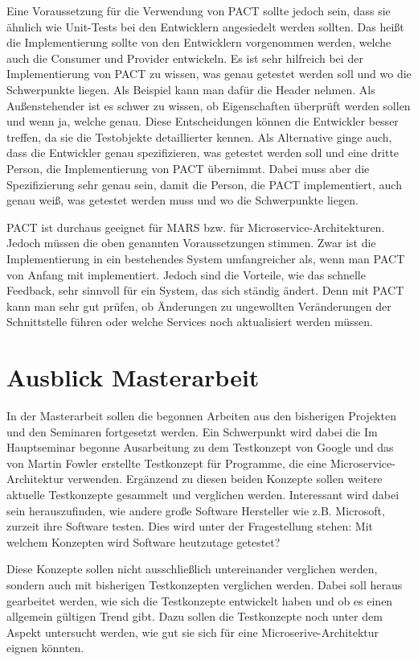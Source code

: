 \documentclass{llncs}
\begin{document}
Eine Voraussetzung für die Verwendung von PACT sollte jedoch sein, dass sie ähnlich wie Unit-Tests bei den Entwicklern angesiedelt werden sollten. Das heißt die Implementierung sollte von den Entwicklern vorgenommen werden, welche auch die Consumer und Provider entwickeln. Es ist sehr hilfreich bei der Implementierung von PACT zu wissen, was genau getestet werden soll und wo die Schwerpunkte liegen. Als Beispiel kann man dafür die Header nehmen. Als Außenstehender ist es schwer zu wissen, ob Eigenschaften überprüft werden sollen und wenn ja, welche genau. Diese Entscheidungen können die Entwickler besser treffen, da sie die Testobjekte detaillierter kennen. Als Alternative ginge auch, dass die Entwickler genau spezifizieren, was getestet werden soll und eine dritte Person, die Implementierung von PACT übernimmt. Dabei muss aber die Spezifizierung sehr genau sein, damit die Person, die PACT implementiert, auch genau weiß, was getestet werden muss und wo die Schwerpunkte liegen. 

PACT ist durchaus geeignet für MARS bzw. für Microservice-Architekturen. Jedoch müssen die oben genannten Voraussetzungen stimmen. Zwar ist die Implementierung in ein bestehendes System umfangreicher als, wenn man PACT von Anfang mit implementiert. Jedoch sind die Vorteile, wie das schnelle Feedback, sehr sinnvoll für ein System, das sich ständig ändert. Denn mit PACT kann man sehr gut prüfen, ob Änderungen zu ungewollten Veränderungen der Schnittstelle führen oder welche Services noch aktualisiert werden müssen.

\section{Ausblick Masterarbeit}
In der Masterarbeit sollen die begonnen Arbeiten aus den bisherigen Projekten und den Seminaren fortgesetzt werden. Ein Schwerpunkt wird dabei die Im Hauptseminar begonne Ausarbeitung zu dem Testkonzept von Google und das von Martin Fowler erstellte Testkonzept für Programme, die eine Microservice-Architektur verwenden. Ergänzend zu diesen beiden Konzepte sollen weitere aktuelle Testkonzepte gesammelt und verglichen werden. Interessant wird dabei sein herauszufinden, wie andere große Software Hersteller wie z.B. Microsoft, zurzeit ihre Software testen. Dies wird unter der Fragestellung stehen: Mit welchem Konzepten wird Software heutzutage getestet?

Diese Konzepte sollen nicht ausschließlich untereinander verglichen werden, sondern auch mit bisherigen Testkonzepten verglichen werden. Dabei soll heraus gearbeitet werden, wie sich die Testkonzepte entwickelt haben und ob es einen allgemein gültigen Trend gibt. Dazu sollen die Testkonzepte noch unter dem Aspekt untersucht werden, wie gut sie sich für eine Microserive-Architektur eignen könnten.
\end{document}
